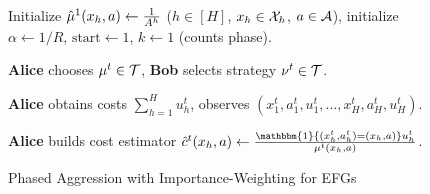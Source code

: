 \documentclass[11pt]{article}
\begin{document}
\begin{figure*}[ht]
\centering
\begin{minipage}{1.0\textwidth}
\begin{algorithm}[H]
    \caption{Phased Aggression with Importance-Weighting for EFGs} \label{algo:phased-aggression-efg-bandit}
    \begin{algorithmic}[1]

        \vspace{1em}
        \State Initialize $\hat{\mu}^{1}(x_h,a) \gets \frac{1}{A^h}$ ($h\in[H]$, $x_h\in\mathcal{X}_h$, $a\in \mathcal{A}$), initialize $\alpha \gets 1/R$, $\text{start}\gets 1$, $k \gets 1$ (counts phase).
            
            \State \textbf{Alice} chooses $\mu^t \in \mathcal{T}$, \textbf{Bob} selects strategy $\nu^t\in\mathcal{T}$. 
            
            \State \textbf{Alice} obtains costs $\sum_{h=1}^H u^t_h$, observes $(x_1^t,a_1^t,u_1^t,\dots,x_H^t, a_H^t, u_H^t)$. \label{line:sample}
            
            \State \textbf{Alice} builds cost estimator $\cHat^t(x_{h},a) \gets \frac{\mathbbm{1}\{(x_{h}^t,a_{h}^t)=(x_{h},a)\}u^t_h}{\mu^t(x_{h},a)}$. \label{line:loss}
            
             \label{line:new-phase}
            

\end{algorithmic}
\end{algorithm}
\end{minipage}
\end{figure*}
\end{document}
